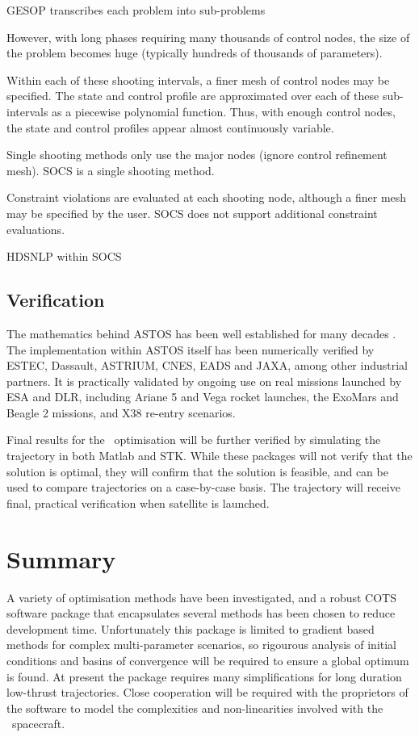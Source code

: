 GESOP transcribes each problem into sub-problems

However, with long phases requiring many thousands of control nodes, the size of the problem becomes huge (typically hundreds of thousands of parameters). 

Within each of these shooting intervals, a finer mesh of control nodes may be specified. The state and control profile are approximated over each of these sub-intervals as a piecewise polynomial function. Thus, with enough control nodes, the state and control profiles appear almost continuously variable.

Single shooting methods only use the major nodes (ignore control refinement mesh). SOCS is a single shooting method.

Constraint violations are evaluated at each shooting node, although a finer mesh may be specified by the user. SOCS does not support additional constraint evaluations.

HDSNLP within SOCS

\subsection{Verification} \label{sub:ASTOS-Verification}

The mathematics behind ASTOS has been well established for many decades \parencite{Kaplan1976}. The implementation within ASTOS itself has been numerically verified by ESTEC, Dassault, ASTRIUM, CNES, EADS and JAXA, among other industrial partners. It is practically validated by ongoing use on real missions launched by ESA and DLR, including Ariane 5 and Vega rocket launches, the ExoMars and Beagle 2 missions, and X38 re-entry scenarios.
 
Final results for the \BW\ optimisation will be further verified by simulating the trajectory in both Matlab and STK. While these packages will not verify that the solution is optimal, they will confirm that the solution is feasible, and can be used to compare trajectories on a case-by-case basis. The trajectory will receive final, practical verification when satellite is launched.

\section{Summary} \label{sec:Optimisation-Summary}

A variety of optimisation methods have been investigated, and a robust COTS software package that encapsulates several methods has been chosen to reduce development time. Unfortunately this package is limited to gradient based methods for complex multi-parameter scenarios, so rigourous analysis of initial conditions and basins of convergence will be required to ensure a global optimum is found. At present the package requires many simplifications for long duration low-thrust trajectories. Close cooperation will be required with the proprietors of the software to model the complexities and non-linearities involved with the \BW\ spacecraft.
 
\clearpage